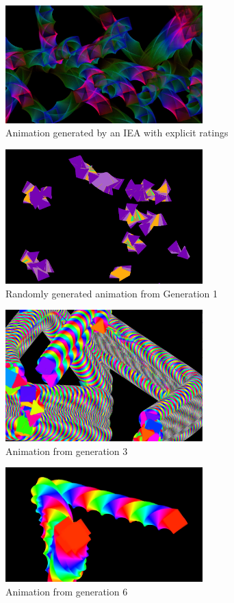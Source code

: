 \documentclass[letterpaper]{article}
\begin{document}
\begin{figure}[!t]
\centering
\includegraphics[width=3in]{ratings.png}
\caption{Animation generated by an IEA with explicit ratings}
\label{fig:ratings}
\end{figure}

\begin{figure}[!t]
\centering
\includegraphics[width=3in]{1.png}
\caption{Randomly generated animation from Generation 1}
\label{fig:gen1}
\end{figure}

\begin{figure}[!t]
\centering
\includegraphics[width=3in]{22.png}
\caption{Animation from generation 3}
\label{fig:gen5}
\end{figure}



\begin{figure}[!t]
\centering
\includegraphics[width=3in]{51.png}
\caption{Animation from generation 6}
\label{fig:gen6}
\end{figure}
\end{document}
